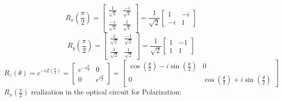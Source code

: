 \documentclass{article}
\begin{document}
\[R_x(\frac{\pi}{2}) = \begin{bmatrix}
		\frac{1}{\sqrt{2}}  & \frac{-i}{\sqrt{2}} \\
		\frac{-i}{\sqrt{2}} & \frac{1}{\sqrt{2}}
	\end{bmatrix} = \frac{1}{\sqrt{2}}
	\begin{bmatrix}
		1 & -i \\
		-i & 1
	\end{bmatrix}
\]
\[R_y(\frac{\pi}{2}) = \begin{bmatrix}
		\frac{1}{\sqrt{2}} & \frac{-1}{\sqrt{2}} \\
		\frac{1}{\sqrt{2}} & \frac{1}{\sqrt{2}}
	\end{bmatrix} = \frac{1}{\sqrt{2}} \begin{bmatrix}
		1 & -1 \\
		1 & 1
	\end{bmatrix}\]
\[
	R_z(\theta) = e^{-iZ(\frac{\theta}{2})} =
	\begin{bmatrix}
		e^{-i \frac{\theta}{2}} & 0                      \\
		0                       & e^{i \frac{\theta}{2}}
	\end{bmatrix}
	= \begin{bmatrix}
		\cos(\frac{\theta}{2}) - i \sin(\frac{\theta}{2}) & 0                      \\
		0                                                  & \cos(\frac{\theta}{2}) + i \sin(\frac{\theta}{2})
	\end{bmatrix}
\]
$R_x(\frac{\pi}{2})$ realization in the optical circuit for Polarization:
\end{document}
